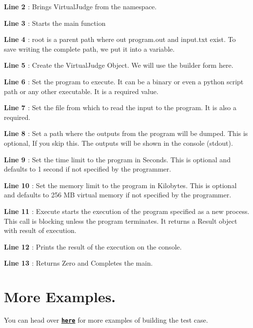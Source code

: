 {\bfseries{Line 2 }} \+: Brings Virtual\+Judge from the namespace.

{\bfseries{Line 3 }} \+: Starts the main function

{\bfseries{Line 4 }} \+: root is a parent path where out {\ttfamily program.\+out} and {\ttfamily input.\+txt} exist. To save writing the complete path, we put it into a variable.

{\bfseries{Line 5 }} \+: Create the Virtual\+Judge Object. We will use the builder form here.

{\bfseries{Line 6 }} \+: Set the program to execute. It can be a binary or even a python script path or any other executable. It is a required value.

{\bfseries{Line 7 }} \+: Set the file from which to read the input to the program. It is also a required.

{\bfseries{Line 8 }} \+: Set a path where the outputs from the program will be dumped. This is optional, If you skip this. The outputs will be shown in the console (stdout).

{\bfseries{Line 9 }} \+: Set the time limit to the program in Seconds. This is optional and defaults to 1 second if not specified by the programmer.

{\bfseries{Line 10 }} \+: Set the memory limit to the program in Kilobytes. This is optional and defaults to 256 MB virtual memory if not specified by the programmer.

{\bfseries{Line 11 }} \+: Execute starts the execution of the program specified as a new process. This call is blocking unless the program terminates. It returns a Result object with result of execution.

{\bfseries{Line 12 }} \+: Prints the result of the execution on the console.

{\bfseries{Line 13 }} \+: Returns Zero and Completes the main. 

\hypertarget{index_more_example}{}\section{More Examples.}\label{index_more_example}
You can head over 
\href{https://github.com/coder3101/testcaser/tree/master/examples}{\texttt{ {\bfseries{here}}}} for more examples of building the test case. 